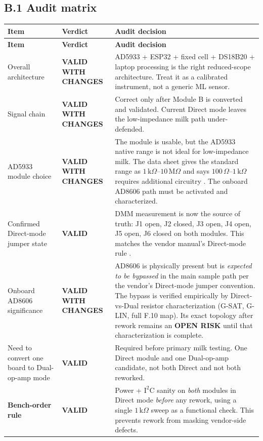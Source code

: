 \documentclass[11pt,a4paper]{article}
\newcommand{\kohm}[1]{\ensuremath{#1\,\mathrm{k}\Omega}}
\newcommand{\Mohm}[1]{\ensuremath{#1\,\mathrm{M}\Omega}}
\newcommand{\Rohm}[1]{\ensuremath{#1\,\Omega}}
\newcommand{\VALID}{\textcolor{EISGreen}{\textbf{VALID}}}
\newcommand{\VALIDCHANGES}{\textcolor{EISTeal}{\textbf{VALID WITH CHANGES}}}
\newcommand{\OPENRISK}{\textcolor{EISRed}{\textbf{OPEN RISK}}}
\begin{document}
\subsection{B.1 Audit matrix}

\small
\begin{xltabular}{\textwidth}{L{38mm}L{32mm}Y}
\toprule
\textbf{Item} & \textbf{Verdict} & \textbf{Audit decision}\\
\midrule
\endfirsthead
\toprule
\textbf{Item} & \textbf{Verdict} & \textbf{Audit decision}\\
\midrule
\endhead

Overall architecture & \VALIDCHANGES & AD5933 + ESP32 + fixed cell + DS18B20 + laptop processing is the right reduced-scope architecture. Treat it as a calibrated instrument, not a generic ML sensor.\\
Signal chain & \VALIDCHANGES & Correct only after Module B is converted and validated. Current Direct mode leaves the low-impedance milk path under-defended.\\
AD5933 module choice & \VALIDCHANGES & The module is usable, but the AD5933 native range is not ideal for low-impedance milk. The data sheet gives the standard range as \kohm{1}--\Mohm{10} and says \Rohm{100}--\kohm{1} requires additional circuitry \cite{ad5933ds}. The onboard AD8606 path must be activated and characterized.\\
Confirmed Direct-mode jumper state & \VALID & DMM measurement is now the source of truth: J1 open, J2 closed, J3 open, J4 open, J5 open, J6 closed on both modules. This matches the vendor manual's Direct-mode rule \cite{vendorManual}.\\
Onboard AD8606 significance & \VALIDCHANGES & AD8606 is physically present but is \emph{expected to be bypassed} in the main sample path per the vendor's Direct-mode jumper convention. The bypass is verified empirically by Direct-vs-Dual resistor characterization (G-SAT, G-LIN, full F.10 map). Its exact topology after rework remains an \OPENRISK{} until that characterization is complete.\\
Need to convert one board to Dual-op-amp mode & \VALID & Required before primary milk testing. One Direct module and one Dual-op-amp candidate, not both Direct and not both reworked.\\
\textbf{Bench-order rule} & \VALID & Power + $\mathrm{I^2C}$ sanity on \emph{both} modules in Direct mode \emph{before} any rework, using a single \kohm{1} sweep as a functional check. This prevents rework from masking vendor-side defects.\\

\end{xltabular}
\end{document}
